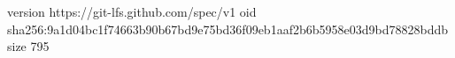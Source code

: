 version https://git-lfs.github.com/spec/v1
oid sha256:9a1d04bc1f74663b90b67bd9e75bd36f09eb1aaf2b6b5958e03d9bd78828bddb
size 795
